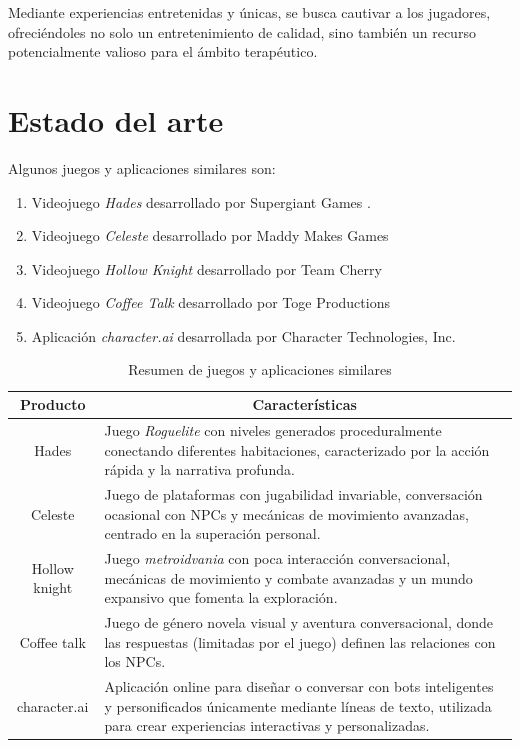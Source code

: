 \documentclass[12pt,twoside]{article}
\begin{document}
	Mediante experiencias entretenidas y únicas, se busca cautivar a los jugadores, ofreciéndoles no solo un entretenimiento de calidad, sino también un recurso potencialmente valioso para el ámbito terapéutico.
	
	\clearpage
	\section{Estado del arte}
	Algunos juegos y aplicaciones similares son:
	\begin{enumerate}[noitemsep]
		\item Videojuego \textit{Hades} desarrollado por Supergiant Games \cite{game: hades}. 

		\item Videojuego \textit{Celeste} desarrollado por Maddy Makes Games \cite{game: celeste}

		\item Videojuego \textit{Hollow Knight} desarrollado por Team Cherry \cite{game: hollow}
		
		\item Videojuego \textit{Coffee Talk} desarrollado por Toge Productions \cite{game: coffee}
		
		\item Aplicación \textit{character.ai} desarrollada por Character Technologies, Inc. \cite{app: character}
	\end{enumerate}
	
	\begin{table}[H]
		\centering
		\begin{tabular}{|c|p{9cm}|}
			\hline
			\textbf{Producto} & \multicolumn{1}{c|}{\textbf{Características}} \\ \hline
			 Hades &  Juego \textit{Roguelite} con niveles generados proceduralmente conectando diferentes habitaciones, caracterizado por la acción rápida y la narrativa profunda.\\ \hline
			 
			 Celeste &  Juego de plataformas con jugabilidad invariable, conversación ocasional con NPCs y mecánicas de movimiento avanzadas, centrado en la superación personal. \\ \hline
			 
			 Hollow knight &   Juego \textit{metroidvania} con poca interacción conversacional, mecánicas de movimiento y combate avanzadas y un mundo expansivo que fomenta la exploración. \\ \hline
			 
			 Coffee talk &   Juego de género novela visual y aventura conversacional, donde las respuestas (limitadas por el juego) definen las relaciones con los NPCs.  \\ \hline
			 
			 character.ai&  Aplicación online para diseñar o conversar con bots inteligentes y personificados únicamente mediante líneas de texto, utilizada para crear experiencias interactivas y personalizadas.  \\ \hline
		\end{tabular}
		\caption{Resumen de juegos y aplicaciones similares}
		\label{table: aplicaciones}
	\end{table} 
	
\end{document}
